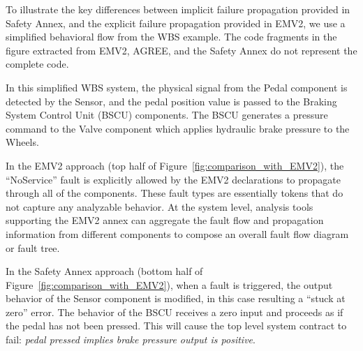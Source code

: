 To illustrate the key differences between implicit failure propagation provided in Safety Annex, and the explicit failure propagation provided in EMV2, we use a simplified behavioral flow from the WBS example. The code fragments in the figure extracted from EMV2, AGREE, and the Safety Annex do not represent the complete code. 

In this simplified WBS system, the physical signal from the Pedal component is detected by the Sensor, and the pedal position value is passed to the Braking System Control Unit (BSCU) components.  The BSCU generates a pressure command to the Valve component which applies hydraulic brake pressure to the Wheels. 

In the EMV2 approach (top half of Figure~\ref{fig:comparison_with_EMV2}), the ``NoService'' fault is explicitly allowed by the EMV2 declarations to propagate through all of the components. These fault types are essentially tokens that do not capture any analyzable behavior. At the system level, analysis tools supporting the EMV2 annex can aggregate the fault flow and propagation information from different components to compose an overall fault flow diagram or fault tree. 

In the Safety Annex approach (bottom half of Figure~\ref{fig:comparison_with_EMV2}), when a fault is triggered, the output behavior of the Sensor component is modified, in this case resulting a ``stuck at zero'' error. The behavior of the BSCU receives a zero input and proceeds as if the pedal has not been pressed. This will cause the top level system contract to fail: {\em pedal pressed implies brake pressure output is positive}.

